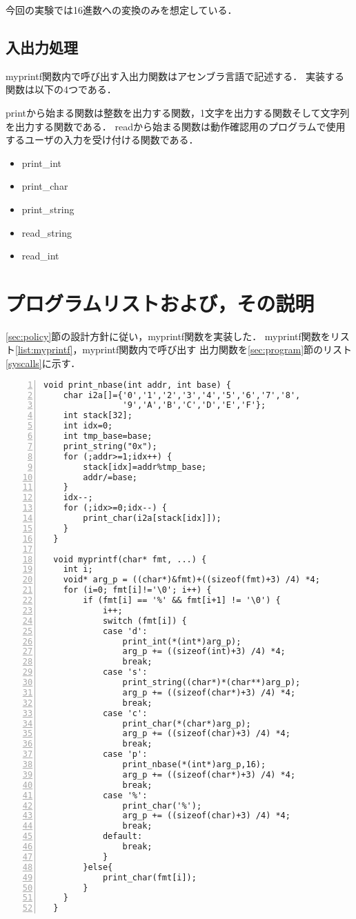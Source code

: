 \documentclass[11pt]{jarticle}
\begin{document}
今回の実験では16進数への変換のみを想定している．

\subsection{入出力処理} \label{sec:io}

myprintf関数内で呼び出す入出力関数はアセンブラ言語で記述する．
実装する関数は以下の4つである．

printから始まる関数は整数を出力する関数，1文字を出力する関数そして文字列を出力する関数である．
readから始まる関数は動作確認用のプログラムで使用するユーザの入力を受け付ける関数である．

\begin{itemize}
  \item print\_int
  \item print\_char
  \item print\_string
  \item read\_string
  \item read\_int
\end{itemize}

\section{プログラムリストおよび，その説明} \label{sec:program_exp}

\ref{sec:policy}節の設計方針に従い，myprintf関数を実装した．
myprintf関数をリスト\ref{list:myprintf}，myprintf関数内で呼び出す
出力関数を\ref{sec:program}節のリスト\ref{syscalls}に示す．

\begin{lstlisting}[label=list:myprintf,caption=myprintf関数,numbers=left]
  void print_nbase(int addr, int base) {
    char i2a[]={'0','1','2','3','4','5','6','7','8',
                '9','A','B','C','D','E','F'};
    int stack[32];
    int idx=0;
    int tmp_base=base;
    print_string("0x");
    for (;addr>=1;idx++) {
        stack[idx]=addr%tmp_base;
        addr/=base;
    }
    idx--;
    for (;idx>=0;idx--) {
        print_char(i2a[stack[idx]]);
    }
  }

  void myprintf(char* fmt, ...) {
    int i;
    void* arg_p = ((char*)&fmt)+((sizeof(fmt)+3) /4) *4;
    for (i=0; fmt[i]!='\0'; i++) {
        if (fmt[i] == '%' && fmt[i+1] != '\0') {
            i++;
            switch (fmt[i]) {
            case 'd':
                print_int(*(int*)arg_p);
                arg_p += ((sizeof(int)+3) /4) *4;
                break;
            case 's':
                print_string((char*)*(char**)arg_p);
                arg_p += ((sizeof(char*)+3) /4) *4;
                break;
            case 'c':
                print_char(*(char*)arg_p);
                arg_p += ((sizeof(char)+3) /4) *4;
                break;
            case 'p':
                print_nbase(*(int*)arg_p,16);
                arg_p += ((sizeof(char*)+3) /4) *4;
                break;
            case '%':
                print_char('%');
                arg_p += ((sizeof(char)+3) /4) *4;
                break;
            default:
                break;
            }
        }else{
            print_char(fmt[i]);
        }
    }
  }
\end{lstlisting}
\end{document}

